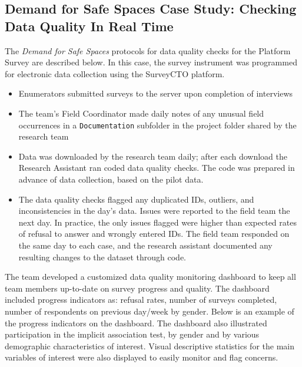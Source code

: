 \documentclass[
]{book}
\providecommand{\tightlist}{%
  \setlength{\itemsep}{0pt}\setlength{\parskip}{0pt}}
\begin{document}
\begin{ex}
\hypertarget{demand-for-safe-spaces-case-study-checking-data-quality-in-real-time}{%
\subsection{Demand for Safe Spaces Case Study: Checking Data Quality In Real Time}\label{demand-for-safe-spaces-case-study-checking-data-quality-in-real-time}}

The \emph{Demand for Safe Spaces} protocols for data quality checks for the Platform Survey are described below. In this case, the survey instrument was programmed for electronic data collection using the SurveyCTO platform.

\begin{itemize}
\tightlist
\item
  Enumerators submitted surveys to the server upon completion of interviews
\item
  The team's Field Coordinator made daily notes of any unusual field occurrences in a \texttt{Documentation} subfolder in the project folder shared by the research team
\item
  Data was downloaded by the research team daily; after each download the Research Assistant ran coded data quality checks. The code was prepared in advance of data collection, based on the pilot data.
\item
  The data quality checks flagged any duplicated IDs, outliers, and inconsistencies in the day's data. Issues were reported to the field team the next day. In practice, the only issues flagged were higher than expected rates of refusal to answer and wrongly entered IDs. The field team responded on the same day to each case, and the research assistant documented any resulting changes to the dataset through code.
\end{itemize}

The team developed a customized data quality monitoring dashboard to keep all team members up-to-date on survey progress and quality. The dashboard included progress indicators as: refusal rates, number of surveys completed, number of respondents on previous day/week by gender. Below is an example of the progress indicators on the dashboard. The dashboard also illustrated participation in the implicit association test, by gender and by various demographic characteristics of interest. Visual descriptive statistics for the main variables of interest were also displayed to easily monitor and flag concerns.


\end{ex}
\end{document}
